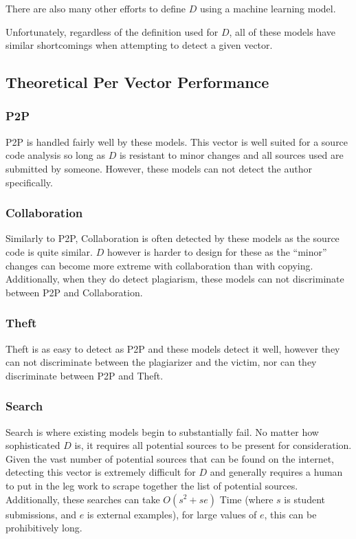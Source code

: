 \documentclass[letterpaper,10pt,conference]{IEEEtran}
\begin{document}
	There are also many other efforts to define $D$ using a machine learning model\cite{uu_thesis}\cite{IIITH_thesis}\cite{mp_ml}\cite{ml_style}.
	
	Unfortunately, regardless of the definition used for $D$, all of these models have similar shortcomings when attempting to detect a given vector.
\subsection{Theoretical Per Vector Performance}
	\subsubsection{P2P}
		P2P is handled fairly well by these models.  This vector is well suited for a source code analysis so long as $D$ is resistant to minor changes and all sources used are submitted by someone.  However, these models can not detect the author specifically.
	\subsubsection{Collaboration}
		Similarly to P2P, Collaboration is often detected by these models as the source code is quite similar.  $D$ however is harder to design for these as the ``minor'' changes can become more extreme with collaboration than with copying.  Additionally, when they do detect plagiarism, these models can not discriminate between P2P and Collaboration.
	\subsubsection{Theft}
		Theft is as easy to detect as P2P and these models detect it well, however they can not discriminate between the plagiarizer and the victim, nor can they discriminate between P2P and Theft.
	\subsubsection{Search}
		Search is where existing models begin to substantially fail.  No matter how sophisticated $D$ is, it requires all potential sources to be present for consideration.  Given the vast number of potential sources that can be found on the internet, detecting this vector is extremely difficult for $D$ and generally requires a human to put in the leg work to scrape together the list of potential sources.  Additionally, these searches can take $O(s^2+se)$ Time (where $s$ is student submissions, and $e$ is external examples), for large values of $e$, this can be prohibitively long.  
\end{document}
